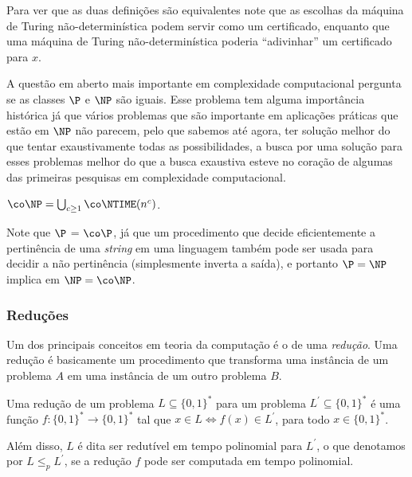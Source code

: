 Para ver que as duas definições são equivalentes note que as escolhas da máquina de Turing não-determinística podem servir como um certificado, enquanto que uma máquina de Turing não-determinística poderia ``adivinhar'' um certificado para $x$.



A questão em aberto mais importante em complexidade computacional pergunta se as classes $\P$ e $\NP$ são iguais. Esse problema tem alguma importância histórica já que vários problemas que são importante em aplicações práticas que estão em $\NP$ não parecem, pelo que sabemos até agora, ter solução melhor do que tentar exaustivamente todas as possibilidades, a busca por uma solução para esses problemas melhor do que a busca exaustiva esteve no coração de algumas das primeiras pesquisas em complexidade computacional.

\begin{defi} [A classe $\co\NP$]

$\co\NP = \bigcup_{c \geq 1} \co\NTIME(n^{c})$.

\end{defi}

Note que $\P$ = $\co\P$, já que um procedimento que decide eficientemente a pertinência de uma \emph{string} em uma linguagem também pode ser usada para decidir a não pertinência (simplesmente inverta a saída), e portanto $\P = \NP$ implica em $\NP = \co\NP$.

\subsubsection{Reduções}

Um dos principais conceitos em teoria da computação é o de uma \emph{redução}. Uma redução é basicamente um procedimento que transforma uma instância de um problema $A$ em uma instância de um outro problema $B$.

\begin{defi} [Reduções] \label{defi:reducoes}

Uma redução de um problema $L \subseteq \{0, 1\}^{*}$ para um problema $L^{\prime} \subseteq \{0, 1\}^{*}$ é uma função $f: \{0, 1\}^{*} \to \{0, 1\}^{*}$ tal que $x \in L \iff f(x) \in L^{\prime}$, para todo $x \in \{0, 1\}^{*}$.

Além disso, $L$ é dita ser redutível em tempo polinomial para $L^{\prime}$, o que denotamos por $L \leq_{p} L^{\prime}$, se a redução $f$ pode ser computada em tempo polinomial.

\end{defi}

